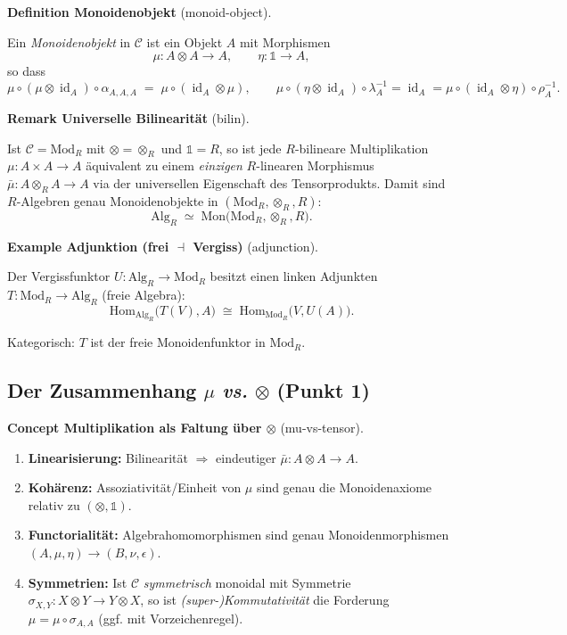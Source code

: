 \documentclass[10pt, letterpaper]{article}
\newcommand{\id}{\operatorname{id}}
\newcommand{\Mod}{\mathrm{Mod}}
\newcommand{\Alg}{\mathrm{Alg}}
\newcommand{\Hom}{\mathrm{Hom}}
\newcommand{\CustomHeading}[3]{%
  \par\medskip\noindent%
  \textbf{#1 #2} \textnormal{(#3)}.\enskip%
}
\newenvironment{DEF}[2]{\begin{unitbox}\CustomHeading{Definition}{#1}{#2}}{\end{unitbox}}
\newenvironment{REM}[2]{\begin{unitbox}\CustomHeading{Remark}{#1}{#2}}{\end{unitbox}}
\newenvironment{EXA}[2]{\begin{unitbox}\CustomHeading{Example}{#1}{#2}}{\end{unitbox}}
\newenvironment{CONC}[2]{\begin{unitbox}\CustomHeading{Concept}{#1}{#2}}{\end{unitbox}}
\begin{document}
\begin{DEF}{Monoidenobjekt}{monoid-object}
Ein \emph{Monoidenobjekt} in \(\mathcal{C}\) ist ein Objekt \(A\) mit Morphismen
\[
\mu:A\otimes A\to A,\qquad \eta:\mathbb{1}\to A,
\]
so dass 
\[
\mu\circ(\mu\otimes\id_A)\circ\alpha_{A,A,A} \;=\; \mu\circ(\id_A\otimes\mu),\qquad
\mu\circ(\eta\otimes\id_A)\circ\lambda_A^{-1}=\id_A=\mu\circ(\id_A\otimes\eta)\circ\rho_A^{-1}.
\]
\end{DEF}

\begin{REM}{Universelle Bilinearität}{bilin}
Ist \(\mathcal{C}=\Mod_R\) mit \(\otimes=\otimes_R\) und \(\mathbb{1}=R\), so ist jede \(R\)-bilineare Multiplikation
\(\mu:A\times A\to A\) äquivalent zu einem \emph{einzigen} \(R\)-linearen Morphismus
\(\bar\mu:A\otimes_R A\to A\) via der universellen Eigenschaft des Tensorprodukts. 
Damit sind \(R\)-Algebren genau Monoidenobjekte in \((\Mod_R,\otimes_R,R)\):
\[
\Alg_R \;\simeq\; \mathrm{Mon}\big(\Mod_R,\otimes_R,R\big).
\]
\end{REM}

\begin{EXA}{Adjunktion (frei \(\dashv\) Vergiss)}{adjunction}
Der Vergissfunktor \(U:\Alg_R\to\Mod_R\) besitzt einen linken Adjunkten \(T:\Mod_R\to\Alg_R\) (freie Algebra):
\[
\Hom_{\Alg_R}\!\big(T(V),A\big)\;\cong\;\Hom_{\Mod_R}\!\big(V,U(A)\big).
\]
\begin{center}
\end{center}
Kategorisch: \(T\) ist der freie Monoidenfunktor in \(\Mod_R\).
\end{EXA}

\subsection{Der Zusammenhang \texorpdfstring{\(\mu\)}{mu} \emph{vs.} \texorpdfstring{\(\otimes\)}{tensor} (Punkt 1)}

\begin{CONC}{Multiplikation als Faltung über \(\otimes\)}{mu-vs-tensor}
\begin{enumerate}[leftmargin=*]
  \item \textbf{Linearisierung:} Bilinearität \(\Rightarrow\) eindeutiger \(\bar\mu:A\otimes A\to A\).
  \item \textbf{Kohärenz:} Assoziativität/Einheit von \(\mu\) sind genau die Monoidenaxiome relativ zu \((\otimes,\mathbb{1})\).
  \item \textbf{Functorialität:} Algebrahomomorphismen sind genau Monoidenmorphismen \((A,\mu,\eta)\to(B,\nu,\epsilon)\).
  \item \textbf{Symmetrien:} Ist \(\mathcal{C}\) \emph{symmetrisch} monoidal mit Symmetrie \(\sigma_{X,Y}:X\otimes Y\to Y\otimes X\),
        so ist \emph{(super-)Kommutativität} die Forderung \(\mu=\mu\circ\sigma_{A,A}\) (ggf. mit Vorzeichenregel).
\end{enumerate}
\end{CONC}
\end{document}
